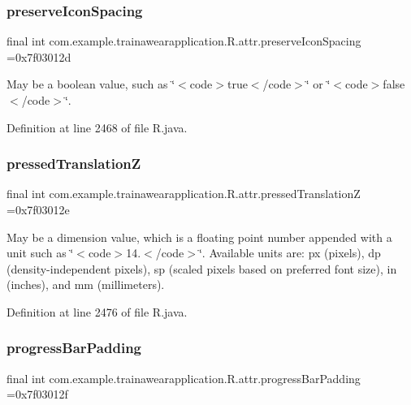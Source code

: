 \subsubsection{\texorpdfstring{preserveIconSpacing}{preserveIconSpacing}}
{\footnotesize\ttfamily final int com.\+example.\+trainawearapplication.\+R.\+attr.\+preserve\+Icon\+Spacing =0x7f03012d\hspace{0.3cm}{\ttfamily [static]}}

May be a boolean value, such as \char`\"{}$<$code$>$true$<$/code$>$\char`\"{} or \char`\"{}$<$code$>$false$<$/code$>$\char`\"{}. 

Definition at line 2468 of file R.\+java.

\mbox{\label{classcom_1_1example_1_1trainawearapplication_1_1_r_1_1attr_a79e518da24f5ed865fce2997a4d9fbf3}} 
\subsubsection{\texorpdfstring{pressedTranslationZ}{pressedTranslationZ}}
{\footnotesize\ttfamily final int com.\+example.\+trainawearapplication.\+R.\+attr.\+pressed\+TranslationZ =0x7f03012e\hspace{0.3cm}{\ttfamily [static]}}

May be a dimension value, which is a floating point number appended with a unit such as \char`\"{}$<$code$>$14.\+5sp$<$/code$>$\char`\"{}. Available units are\+: px (pixels), dp (density-\/independent pixels), sp (scaled pixels based on preferred font size), in (inches), and mm (millimeters). 

Definition at line 2476 of file R.\+java.

\mbox{\label{classcom_1_1example_1_1trainawearapplication_1_1_r_1_1attr_ac7d082a7ed8958addf2d0bafbdcb29cb}} 
\subsubsection{\texorpdfstring{progressBarPadding}{progressBarPadding}}
{\footnotesize\ttfamily final int com.\+example.\+trainawearapplication.\+R.\+attr.\+progress\+Bar\+Padding =0x7f03012f\hspace{0.3cm}{\ttfamily [static]}}

